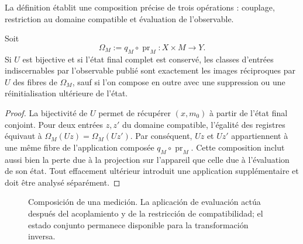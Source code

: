 La définition établit une composition précise de trois opérations :
couplage, restriction au domaine compatible et évaluation de l'observable.

\begin{theorem}
Soit
\[
 \Omega_M:=q_M\circ\operatorname{pr}_M:X\times M\longrightarrow Y.
\]
Si \(U\) est bijective et si l'état final complet est conservé, les classes
d'entrées indiscernables par l'observable publié sont exactement les
images réciproques par \(U\) des fibres de \(\Omega_M\), sauf si l'on compose
en outre avec une suppression ou une réinitialisation ultérieure de l'état.
\end{theorem}
\begin{proof}
La bijectivité de \(U\) permet de récupérer \((x,m_0)\) à partir de l'état final
conjoint. Pour deux entrées \(z,z'\) du domaine compatible, l'égalité des
registres équivaut à
\(\Omega_M(Uz)=\Omega_M(Uz')\). Par conséquent, \(Uz\) et \(Uz'\) appartiennent à une
même fibre de l'application composée \(q_M\circ\operatorname{pr}_M\). Cette
composition inclut aussi bien la perte due à la projection sur l'appareil que
celle due à l'évaluation de son état. Tout effacement ultérieur introduit une
application supplémentaire et doit être analysé séparément.
\end{proof}

\begin{figure}[htbp]
\centering
{}
\caption{Composición de una medición. La aplicación de evaluación actúa
después del acoplamiento y de la restricción de compatibilidad; el estado
conjunto permanece disponible para la transformación inversa.}
\label{p12-83-c16-s1:fig:medicion}
\end{figure}

